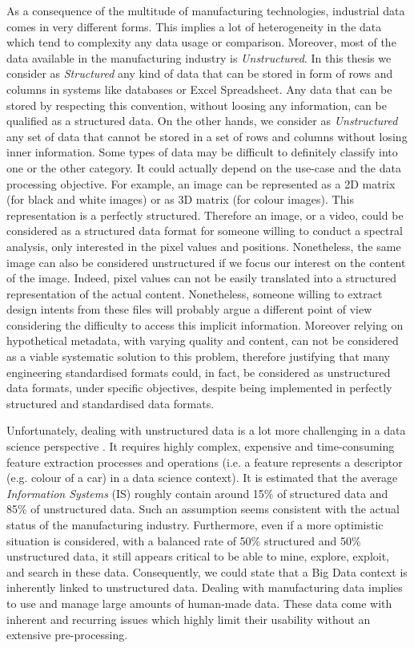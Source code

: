 As a consequence of the multitude of manufacturing technologies, industrial data comes in very different forms. This implies a lot of heterogeneity in the data which tend to complexity any data usage or comparison. Moreover, most of the data available in the manufacturing industry is \textit{Unstructured}. In this thesis we consider as \textit{Structured} any kind of data that can be stored in form of rows and columns in systems like databases or Excel Spreadsheet. Any data that can be stored by respecting this convention, without loosing any information, can be qualified as a structured data. On the other hands, we consider as \textit{Unstructured} any set of data that cannot be stored in a set of rows and columns without losing inner information. Some types of data may be difficult to definitely classify into one or the other category. It could actually depend on the use-case and the data processing objective. For example, an image can be represented as a 2D matrix (for black and white images) or as 3D matrix (for colour images). This representation is a perfectly structured. Therefore an image, or a video, could be considered as a structured data format for someone willing to conduct a spectral analysis, only interested in the pixel values and positions. Nonetheless, the same image can also be considered unstructured if we focus our interest on the content of the image. Indeed, pixel values can not be easily translated into a structured representation of the actual content.
Nonetheless, someone willing to extract design intents from these files will probably argue a different point of view considering the difficulty to access this implicit information. Moreover relying on hypothetical metadata, with varying quality and content, can not be considered as a viable systematic solution to this problem, therefore justifying that many engineering standardised formats could, in fact, be considered as unstructured data formats, under specific objectives, despite being implemented in perfectly structured and standardised data formats.

Unfortunately, dealing with unstructured data is a lot more challenging in a data science perspective \citep{blumberg2003problem}\citep{sagiroglu2013big} \citep{buneman1997adding}. It requires highly complex, expensive and time-consuming feature extraction processes and operations (i.e. a feature represents a descriptor (e.g. colour of a car) in a data science context). It is estimated that the average \textit{Information Systems} (IS) roughly contain around 15\% of structured data and 85\% of unstructured data. Such an assumption seems consistent with the actual status of the manufacturing industry. Furthermore, even if a more optimistic situation is considered, with a balanced rate of 50\% structured and 50\% unstructured data, it still appears critical to be able to mine, explore, exploit, and search in these data. Consequently, we could state that a Big Data context is inherently linked to unstructured data.
Dealing with manufacturing data implies to use and manage large amounts of human-made data. These data come with inherent and recurring issues which highly limit their usability without an extensive pre-processing.

